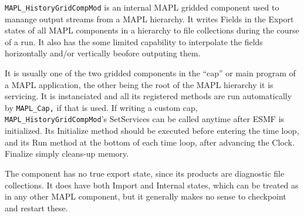 %  
%  
%  
{\tt MAPL\_HistoryGridCompMod} is an internal MAPL gridded component 
used to manange output streams from a MAPL hierarchy. It writes Fields in the
Export states of all MAPL components in a hierarchy to file collections
during the course of a run. It also has the some limited capability to interpolate
the fields horizontally and/or vertically beofore outputing them. 

It is usually one of the
two gridded components in the ``cap'' or main program of a MAPL application,
the other being the root of the MAPL hierarchy it is servicing. It is 
instanciated and all its registered methods are run automatically by 
{\tt MAPL\_Cap,} if that is used.
If writing a custom cap, {\tt MAPL\_HistoryGridCompMod}'s SetServices can be 
called anytime after ESMF is initialized.
Its Initialize method should be executed before entering the time loop, and its
Run method at the bottom of each time loop, after advancing the Clock. Finalize
simply cleans-up memory. 

The component has no true export state, since its products are diagnostic
file collections. It does have both Import and Internal states, which can be treated as
in any other MAPL component, but it generally makes no sense to checkpoint and restart
these.

